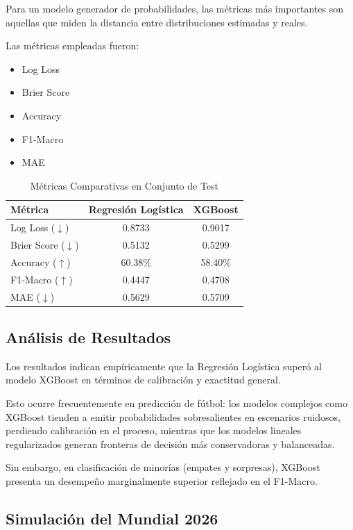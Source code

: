 \documentclass[conference]{IEEEtran}
\begin{document}
	Para un modelo generador de probabilidades, las métricas más importantes son aquellas que miden la distancia entre distribuciones estimadas y reales.
	
	Las métricas empleadas fueron:
	
	\begin{itemize}
		\item Log Loss
		\item Brier Score
		\item Accuracy
		\item F1-Macro
		\item MAE
	\end{itemize}
	
	\begin{table}[h]
		\centering
		\caption{Métricas Comparativas en Conjunto de Test}
		\begin{tabular}{lcc}
			\toprule
			\textbf{Métrica} & \textbf{Regresión Logística} & \textbf{XGBoost} \\
			\midrule
			Log Loss ($\downarrow$) & 0.8733 & 0.9017 \\
			Brier Score ($\downarrow$) & 0.5132 & 0.5299 \\
			Accuracy ($\uparrow$) & 60.38\% & 58.40\% \\
			F1-Macro ($\uparrow$) & 0.4447 & 0.4708 \\
			MAE ($\downarrow$) & 0.5629 & 0.5709 \\
			\bottomrule
		\end{tabular}
	\end{table}
	
	\subsection{Análisis de Resultados}
	
	Los resultados indican empíricamente que la Regresión Logística superó al modelo XGBoost en términos de calibración y exactitud general.
	
	Esto ocurre frecuentemente en predicción de fútbol: los modelos complejos como XGBoost tienden a emitir probabilidades sobresalientes en escenarios ruidosos, perdiendo calibración en el proceso, mientras que los modelos lineales regularizados generan fronteras de decisión más conservadoras y balanceadas.
	
	Sin embargo, en clasificación de minorías (empates y sorpresas), XGBoost presenta un desempeño marginalmente superior reflejado en el F1-Macro.
	
	\subsection{Simulación del Mundial 2026}
	
\end{document}
